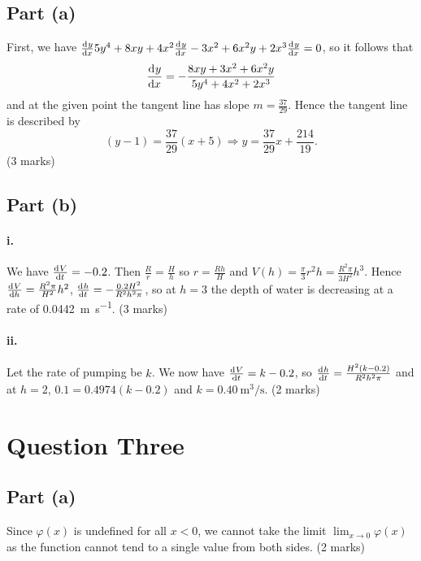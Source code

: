 \documentclass[a4paper]{report}
\begin{document}
\subsection*{Part (a)}
First, we have $ \od{y}{x} 5y^4 + 8xy + 4x^2 \od{y}{x} - 3x^2 + 6x^2 y + 2x^3 \od{y}{x} = 0 $,
so it follows that
\begin{displaymath}
  \dod{y}{x} = -\frac{8xy + 3x^2 + 6 x^2 y}{5y^4 + 4x^2 + 2x^3}
\end{displaymath}
and at the given point the tangent line has slope $ m = \frac{37}{29} $. Hence the tangent line is described by
\begin{displaymath}
  (y - 1) = \frac{37}{29}(x + 5) \Rightarrow y = \frac{37}{29}x + \frac{214}{19}.
\end{displaymath} (3 marks)

\subsection*{Part (b)}
\paragraph{i.}
We have $ \od{V}{t} = -0.2 $. Then $ \frac{R}{r} = \frac{H}{h} $ so $ r = \frac{Rh}{H} $ and $ V(h) = \frac{\pi}{3} r^2 h = \frac{R^2\pi}{3H^2} h^3 $.
Hence $ \od{V}{h} = \frac{R^2\pi}{H^2} h^2 $, $ \od{h}{t} = - \frac{0.2 H^2}{R^2 h^2 \pi} $, so at $ h = 3 $ the depth of water is decreasing
at a rate of \SI{0.0442}{\metre\per\second}. (3 marks)

\paragraph{ii.}
Let the rate of pumping be $ k $. We now have $ \od{V}{t} = k - 0.2 $, so $ \od{h}{t} = \frac{H^2 (k - 0.2)}{R^2 h^2 \pi} $
and at $ h = 2 $, $ 0.1 = 0.4974(k - 0.2) $ and $ k = \SI{0.40}{\metre\cubed\per\second} $. (2 marks)

\section*{Question Three}
\subsection*{Part (a)}
Since $ \varphi(x) $ is undefined for all $ x < 0 $, we cannot take the limit $ \lim_{x \to 0} \varphi(x) $ as the
function cannot tend to a single value from both sides. (2 marks)
\end{document}
